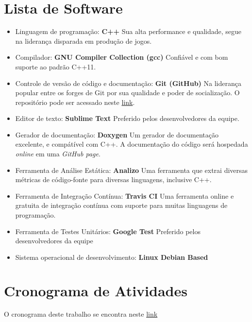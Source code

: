 \section{Lista de Software}

\begin{itemize}
\item{Linguagem de programação:} \textbf{C++}
Sua alta performance e qualidade, segue na liderança disparada em produção de jogos.
\item{Compilador:} \textbf{GNU Compiler Collection (gcc)}
Confiável e com bom suporte ao padrão C++11.
\item{Controle de versão de código e documentação:} \textbf{Git (GitHub)}
Na liderança popular entre os forges de Git por sua qualidade e poder de socialização. O repositório pode ser acessado neste \href{https://github.com/CaioIcy/Dauphine}{link}.
\item{Editor de texto:} \textbf{Sublime Text}
Preferido pelos desenvolvedores da equipe.
\item{Gerador de documentação:} \textbf{Doxygen}
Um gerador de documentação excelente, e compátível com C++. A documentação do código será hospedada \textit{online} em uma \textit{GitHub page}.
\item{Ferramenta de Análise Estática:} \textbf{Analizo}
Uma ferramenta que extrai diversas métricas de código-fonte para diversas linguagens, inclusive C++.
\item{Ferramenta de Integração Contínua:} \textbf{Travis CI}
Uma ferramenta online e gratuita de integração contínua com suporte para muitas linguagens de programação.
\item{Ferramenta de Testes Unitários:} \textbf{Google Test}
Preferido pelos desenvolvedores da equipe
\item{Sistema operacional de desenvolvimento:} \textbf{Linux Debian Based}
\end{itemize}

\section{Cronograma de Atividades}

O cronograma deste trabalho se encontra neste \href{https://trello.com/b/9Y8n9q5X/vv-dauphine}{link}
